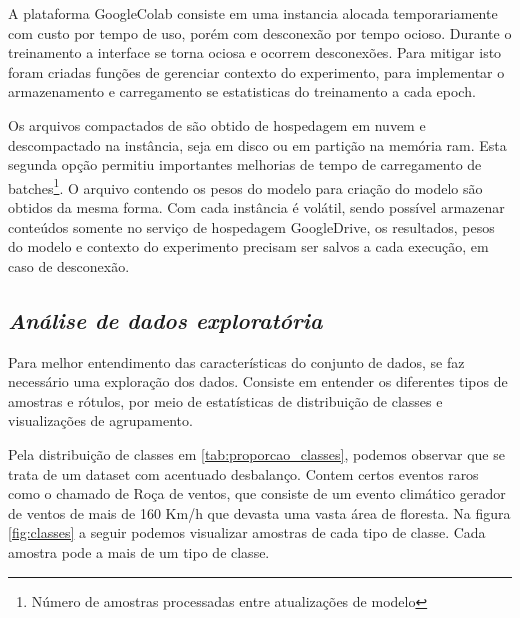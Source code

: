 A plataforma GoogleColab consiste em uma instancia alocada temporariamente com custo por tempo de uso, porém com desconexão por tempo ocioso. Durante o treinamento a interface se torna ociosa e ocorrem desconexões. Para mitigar isto foram criadas funções de gerenciar contexto do experimento, para implementar o armazenamento e carregamento se estatisticas do treinamento a cada epoch.

Os arquivos compactados de são obtido de hospedagem em nuvem e descompactado na instância, seja em disco ou em partição na memória ram. Esta segunda opção permitiu importantes melhorias de tempo de carregamento de batches\footnote[1]{Número de amostras processadas entre atualizações de modelo}. O arquivo contendo os pesos do modelo para criação do modelo são obtidos da mesma forma. Com cada instância é volátil, sendo possível armazenar conteúdos somente no serviço de hospedagem GoogleDrive, os resultados, pesos do modelo e contexto do experimento precisam ser salvos a cada execução, em caso de desconexão.


\subsection{\textit{Análise de dados exploratória}}\label{sec:Cap3_AnaliseDeDadosExploratoria}
Para melhor entendimento das características do conjunto de dados, se faz necessário uma exploração dos dados. Consiste em entender os diferentes tipos de amostras e rótulos, por meio de estatísticas de distribuição de classes e visualizações de agrupamento.


Pela distribuição de classes em \ref{tab:proporcao_classes}, podemos observar que se trata de um dataset com acentuado desbalanço. Contem certos eventos raros como o chamado de Roça de ventos, que consiste de um evento climático gerador de ventos de mais de 160 Km/h que devasta uma vasta área de floresta. Na figura \ref{fig:classes} a seguir podemos visualizar amostras de cada tipo de classe. Cada amostra pode a mais de um tipo de classe.  

